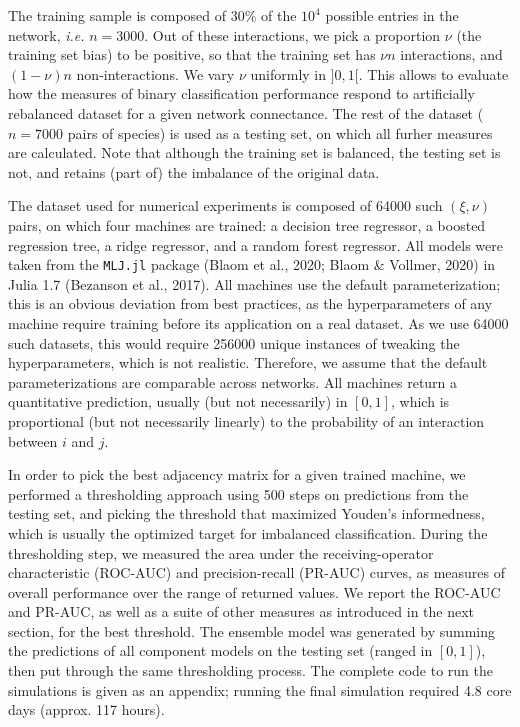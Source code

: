 \documentclass[10pt,oneside]{article}
\begin{document}
The training sample is composed of 30\% of the \(10^4\) possible entries
in the network, \emph{i.e.} \(n=3000\). Out of these interactions, we
pick a proportion \(\nu\) (the training set bias) to be positive, so
that the training set has \(\nu n\) interactions, and \((1-\nu) n\)
non-interactions. We vary \(\nu\) uniformly in \(]0,1[\). This allows to
evaluate how the measures of binary classification performance respond
to artificially rebalanced dataset for a given network connectance. The
rest of the dataset (\(n=7000\) pairs of species) is used as a testing
set, on which all furher measures are calculated. Note that although the
training set is balanced, the testing set is not, and retains (part of)
the imbalance of the original data.

The dataset used for numerical experiments is composed of 64000 such
\((\xi, \nu)\) pairs, on which four machines are trained: a decision
tree regressor, a boosted regression tree, a ridge regressor, and a
random forest regressor. All models were taken from the \texttt{MLJ.jl}
package (Blaom et al., 2020; Blaom \& Vollmer, 2020) in Julia 1.7
(Bezanson et al., 2017). All machines use the default parameterization;
this is an obvious deviation from best practices, as the hyperparameters
of any machine require training before its application on a real
dataset. As we use 64000 such datasets, this would require 256000 unique
instances of tweaking the hyperparameters, which is not realistic.
Therefore, we assume that the default parameterizations are comparable
across networks. All machines return a quantitative prediction, usually
(but not necessarily) in \([0,1]\), which is proportional (but not
necessarily linearly) to the probability of an interaction between \(i\)
and \(j\).

In order to pick the best adjacency matrix for a given trained machine,
we performed a thresholding approach using 500 steps on predictions from
the testing set, and picking the threshold that maximized Youden's
informedness, which is usually the optimized target for imbalanced
classification. During the thresholding step, we measured the area under
the receiving-operator characteristic (ROC-AUC) and precision-recall
(PR-AUC) curves, as measures of overall performance over the range of
returned values. We report the ROC-AUC and PR-AUC, as well as a suite of
other measures as introduced in the next section, for the best
threshold. The ensemble model was generated by summing the predictions
of all component models on the testing set (ranged in \([0,1]\)), then
put through the same thresholding process. The complete code to run the
simulations is given as an appendix; running the final simulation
required 4.8 core days (approx. 117 hours).
\end{document}

